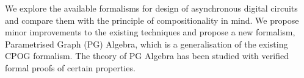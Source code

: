 \abstract

We explore the available formalisms for design of asynchronous digital
circuits and compare them with the principle of compositionality in
mind. We propose minor improvements to the existing techniques and
propose a new formalism, Parametrised Graph (PG) Algebra, which is a
generalisation of the existing CPOG formalism. The theory of PG Algebra
has been studied with verified formal proofs of certain properties.





















